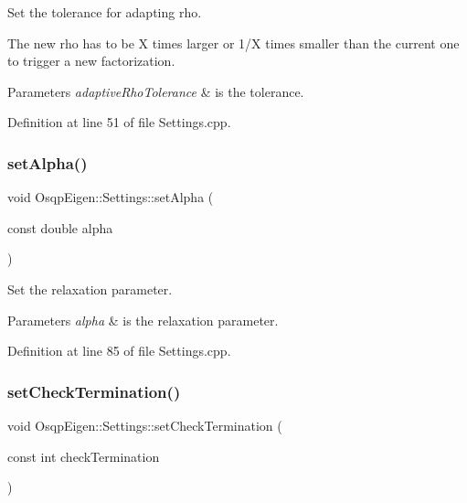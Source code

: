 Set the tolerance for adapting rho. 

The new rho has to be X times larger or 1/X times smaller than the current one to trigger a new factorization. 
\begin{DoxyParams}{Parameters}
{\em adaptive\+Rho\+Tolerance} & is the tolerance. \\
\hline
\end{DoxyParams}


Definition at line 51 of file Settings.\+cpp.

\mbox{\label{classOsqpEigen_1_1Settings_a141f192237f68447ac898a222bb3c1c9}} 
\subsubsection{\texorpdfstring{set\+Alpha()}{setAlpha()}}
{\footnotesize\ttfamily void Osqp\+Eigen\+::\+Settings\+::set\+Alpha (\begin{DoxyParamCaption}\item[{const double}]{alpha }\end{DoxyParamCaption})}



Set the relaxation parameter. 


\begin{DoxyParams}{Parameters}
{\em alpha} & is the relaxation parameter. \\
\hline
\end{DoxyParams}


Definition at line 85 of file Settings.\+cpp.

\mbox{\label{classOsqpEigen_1_1Settings_aebc0ad14de70c7c68c09135929dd7a75}} 
\subsubsection{\texorpdfstring{set\+Check\+Termination()}{setCheckTermination()}}
{\footnotesize\ttfamily void Osqp\+Eigen\+::\+Settings\+::set\+Check\+Termination (\begin{DoxyParamCaption}\item[{const int}]{check\+Termination }\end{DoxyParamCaption})}



